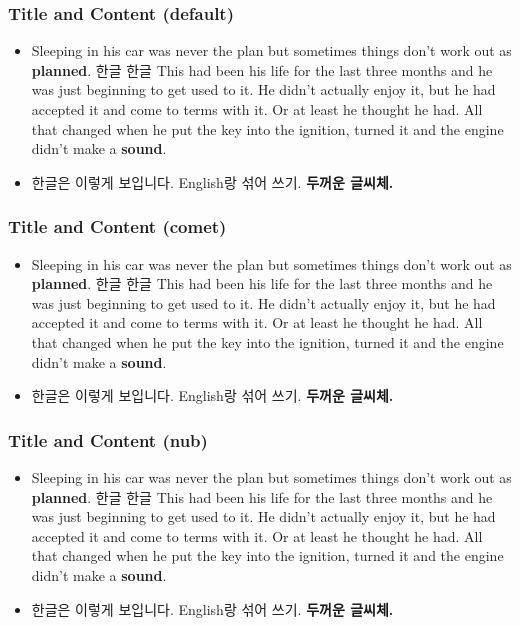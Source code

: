 

\frame[plain]{\titlepage}


\begin{frame}
    \frametitle{Title and Content (default)}
    \Large
    \begin{itemize}
    \item Sleeping in his car was never the plan but sometimes things don't work out as \textbf{planned}. 한글 한글 This had been his life for the last three months and he was just beginning to get used to it. He didn't actually enjoy it, but he had accepted it and come to terms with it. Or at least he thought he had. All that changed when he put the key into the ignition, turned it and the engine didn't make a \textbf{sound}.
    \item 한글은 이렇게 보입니다. English랑 섞어 쓰기. \textbf{두꺼운 글씨체.}
    \end{itemize}
\end{frame}


\begin{frame}
    \frametitle{\comet Title and Content (comet)}
    \Large
    \begin{itemize}
    \item Sleeping in his car was never the plan but sometimes things don't work out as \textbf{planned}. 한글 한글 This had been his life for the last three months and he was just beginning to get used to it. He didn't actually enjoy it, but he had accepted it and come to terms with it. Or at least he thought he had. All that changed when he put the key into the ignition, turned it and the engine didn't make a \textbf{sound}.
    \item 한글은 이렇게 보입니다. English랑 섞어 쓰기. \textbf{두꺼운 글씨체.}
    \end{itemize}
\end{frame}

\begin{frame}
    \frametitle{\nub Title and Content (nub)}
    \Large
    \begin{itemize}
    \item Sleeping in his car was never the plan but sometimes things don't work out as \textbf{planned}. 한글 한글 This had been his life for the last three months and he was just beginning to get used to it. He didn't actually enjoy it, but he had accepted it and come to terms with it. Or at least he thought he had. All that changed when he put the key into the ignition, turned it and the engine didn't make a \textbf{sound}.
    \item 한글은 이렇게 보입니다. English랑 섞어 쓰기. \textbf{두꺼운 글씨체.}
    \end{itemize}
\end{frame}


